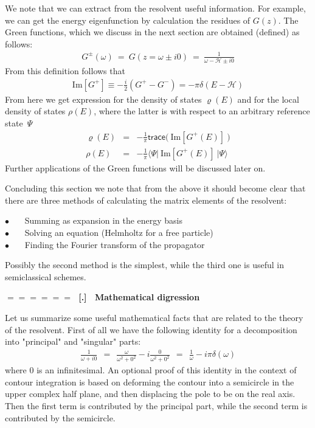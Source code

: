 \documentclass[onecolumn,fleqn]{revtex4}
\newcommand{\trc}{\mathsf{trace}}
\newcommand{\im}{\mathrm{Im}}
\newcommand{\gdos}{\varrho} \newcommand{\EPS}{\mathcal{E}}
\newcommand{\bitem}{$\bullet$ \ \ \ }
\newcommand{\beq}{\begin{eqnarray}}
\newcommand{\eeq}{\end{eqnarray}}
\renewcommand{\thesubsection}{\arabic{subsection}}
\renewcommand{\thesubsubsection}{\arabic{subsubsection}}
\newcommand{\sheadC}[1]
{
\addtocounter{subsubsection}{1}
\vspace{5mm}
{\Large\bf $=\!=\!=\!=\!=\!=\;$ [\thesubsection.\thesubsubsection] \ #1}  
\nopagebreak
\phantomsection
}
\begin{document}
We note that we can extract from the resolvent 
useful information. For example, we can get 
the energy eigenfunction by calculation the residues 
of $G(z)$. The Green functions, which we discuss 
in the next section are obtained (defined) as follows: 
\beq
G^{\pm}(\omega) \ = \ G(z=\omega \pm i0) \ = \ \frac{1}{\omega - \mathcal{H} \pm i0}
\eeq
From this definition follows that 
\beq
\im[G^{+}]  \equiv  -\frac{i}{2} (G^{+}-G^{-}) = -\pi \delta(E-\mathcal{H})
\eeq
From here we get expression for 
the density of states $\gdos(E)$ and 
for the local density of states $\rho(E)$,    
where the latter is with respect 
to an arbitrary reference state~$\Psi$ 
\beq
\gdos(E) &=&  -\frac{1}{\pi} \trc\Big( \ \im[G^{+}(E)] \ \Big)
\\ \nonumber
\rho(E) &=& -\frac{1}{\pi} \Big\langle \Psi \Big| \ \im[G^{+}(E)] \ \Big| \Psi \Big\rangle
\eeq
Further applications of the Green functions 
will be discussed later on.



Concluding this section we note that from the 
above it should become clear that 
there are three methods of calculating 
the matrix elements of the resolvent: 

\bitem Summing as expansion in the energy basis  \\
\bitem Solving an equation (Helmholtz for a free particle) \\
\bitem Finding the Fourier transform of the propagator 

Possibly the second method is the simplest, 
while the third one is useful in semiclassical schemes.      



\sheadC{Mathematical digression}
 
Let us summarize some useful mathematical facts 
that are related to the theory of the resolvent. 
First of all we have the following identity for 
a decomposition into "principal" and "singular" parts: 
\beq
\frac{1}{\omega+i0} \ \ = \ \ \frac{\omega}{\omega^2+0^2}-i\frac{0}{\omega^2+0^2} 
\ \ = \ \  \frac{1}{\omega}-i\pi\delta(\omega)
\eeq
where $0$ is an infinitesimal. An optional proof of this 
identity in the context of contour integration is based 
on deforming the contour into a semicircle in the upper 
complex half plane, and then displacing the pole to be on  
the real axis. Then the first term is contributed 
by the principal part, while the second term is contributed by the semicircle. 
\end{document}
